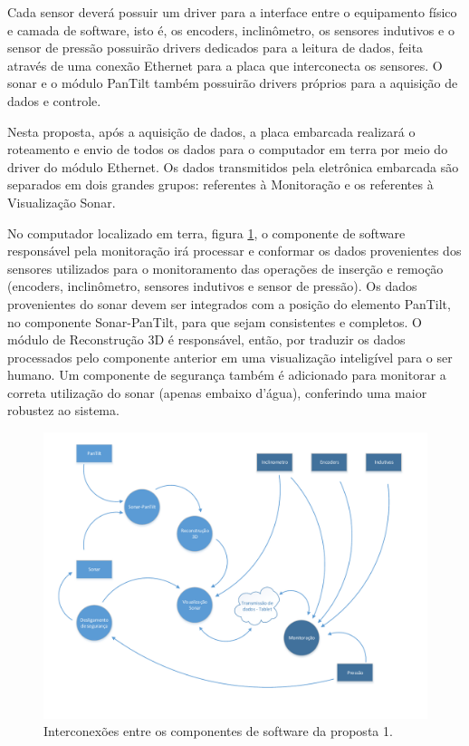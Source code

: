 Cada sensor deverá possuir um driver para a interface entre o equipamento físico
e camada de software, isto é, os encoders, inclinômetro, os sensores indutivos e
o sensor de pressão possuirão drivers dedicados para a leitura de dados, feita
através de uma conexão Ethernet para a placa que interconecta os sensores. O
sonar e o módulo PanTilt também possuirão drivers próprios para a aquisição de
dados e controle.

Nesta proposta, após a aquisição de dados, a placa embarcada realizará o
roteamento e envio de todos os dados para o computador em terra por meio do
driver do módulo Ethernet.  Os dados transmitidos pela eletrônica embarcada são
separados em dois grandes grupos: referentes à Monitoração e os referentes à
Visualização Sonar.

No computador localizado em terra, figura \ref{fig:ES:1}, o componente de
software responsável pela monitoração irá processar e conformar os dados
provenientes dos sensores utilizados para o monitoramento das operações de
inserção e remoção (encoders, inclinômetro, sensores indutivos e sensor de
pressão). Os dados provenientes do sonar devem ser integrados com a posição do
elemento PanTilt, no componente Sonar-PanTilt, para que sejam consistentes e
completos.  O módulo de Reconstrução 3D é responsável, então, por traduzir os
dados processados pelo componente anterior em uma visualização inteligível para
o ser humano.  Um componente de segurança também é adicionado para monitorar a
correta utilização do sonar (apenas embaixo d’água), conferindo uma maior
robustez ao sistema.

\begin{figure}[H] 
\centering
\includegraphics[width=\textwidth,height=\textheight,keepaspectratio]{figs/software/EstrutSoft/prop1_soft_2.pdf}
\caption{Interconexões entre os componentes de software da proposta 1.}
\label{fig:ES:1}
\end{figure}

